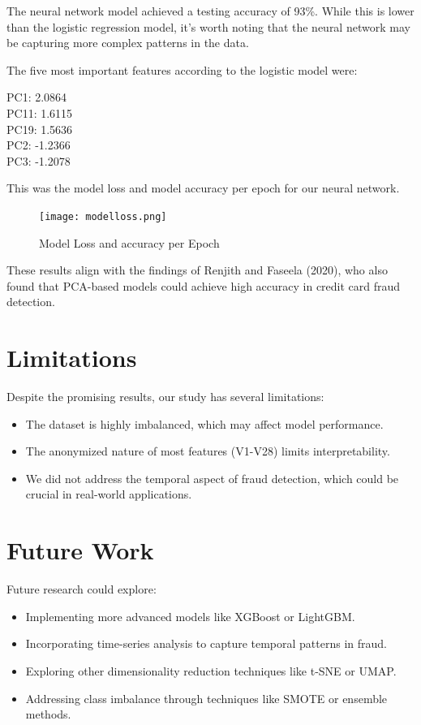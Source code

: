 \documentclass{article}
\begin{document}
The neural network model achieved a testing accuracy of 93\%. While this is lower than the logistic regression model, it's worth noting that the neural network may be capturing more complex patterns in the data.

The five most important features according to the logistic model were:
\begin{center}
    PC1: 2.0864 \\
    PC11: 1.6115 \\
    PC19: 1.5636 \\
    PC2: -1.2366 \\
    PC3: -1.2078
\end{center}

This was the model loss and model accuracy per epoch for our neural network.

\begin{figure}[H]
    \centering
    \texttt{[image: modelloss.png]} 
    \caption{Model Loss and accuracy per Epoch}
    \label{fig:modelloss}
\end{figure}


These results align with the findings of Renjith and Faseela (2020), who also found that PCA-based models could achieve high accuracy in credit card fraud detection.

\section{Limitations}
Despite the promising results, our study has several limitations:
\begin{itemize}
    \item The dataset is highly imbalanced, which may affect model performance.
    \item The anonymized nature of most features (V1-V28) limits interpretability.
    \item We did not address the temporal aspect of fraud detection, which could be crucial in real-world applications.
\end{itemize}

\section{Future Work}
Future research could explore:
\begin{itemize}
    \item Implementing more advanced models like XGBoost or LightGBM.
    \item Incorporating time-series analysis to capture temporal patterns in fraud.
    \item Exploring other dimensionality reduction techniques like t-SNE or UMAP.
    \item Addressing class imbalance through techniques like SMOTE or ensemble methods.
\end{itemize}
\end{document}
